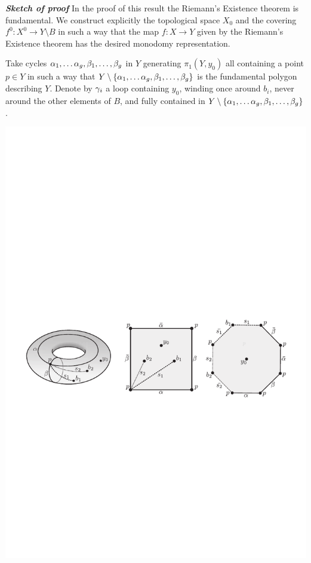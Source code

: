 \documentclass[10pt]{beamer}
\begin{document}
\begin{frame}

\emph{\bf Sketch of proof}
	In the proof of this result the Riemann's Existence theorem is fundamental. We construct explicitly the topological space $X_0$ and the covering $f^0\colon X^0\to Y\setminus B$ in such a way that the map $f\colon X\to Y$ given by the Riemann's Existence theorem has the desired monodomy representation. 
	
	Take cycles $\alpha_1,\ldots\alpha_g,\beta_1,\ldots,\beta_g$ in $Y$ generating $\pi_1(Y,y_0)$ all containing a point $p\in Y$ in such a way that $Y\setminus\{\alpha_1,\ldots\alpha_g,\beta_1,\ldots,\beta_g\}$ is the fundamental polygon describing $Y$. Denote by $\gamma_i$ a loop containing $y_0$, winding once around $b_i$, never around the other elements of $B$, and fully contained in $Y\setminus\{\alpha_1,\ldots\alpha_g,\beta_1,\ldots,\beta_g\}$.
	
	\includegraphics[width=\textwidth]{../figures/CM-fig-7-6.pdf}
	
\end{frame}
\end{document}

